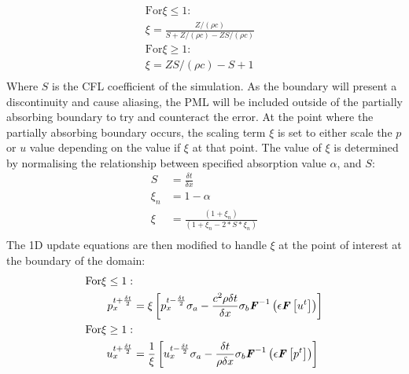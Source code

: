 \begin{equation}
\begin{aligned}
\textrm{For} \xi \leq 1: & \\
\xi = \frac{Z / (\rho c)}{S + Z / (\rho c) - Z S / (\rho c)}\\
\textrm{For} \xi \geq 1: & \\
\xi = Z S / (\rho c) - S + 1\\
\end{aligned}
\end{equation}
Where $S$ is the CFL coefficient of the simulation. As the boundary will present a discontinuity and cause aliasing, the PML will be included outside of the partially absorbing boundary to try and counteract the error. At the point where the partially absorbing boundary occurs, the scaling term $\xi$ is set to either scale the $p$ or $u$ value depending on the value if $\xi$ at that point. The value of $\xi$ is determined by normalising the relationship between specified absorption value $\alpha$, and $S$:\\
\begin{equation}
\begin{aligned}
S & = \frac{\delta t}{\delta x} \\
\xi_n & = 1 - \alpha \\
\xi & = \frac{(1 + \xi_n)}{(1 + \xi_n - 2 * S * \xi_n)}\\
\end{aligned}
\end{equation}
The 1D update equations are then modified to handle $\xi$ at the point of interest at the boundary of the domain:\\
\begin{equation}
\begin{aligned}
\textrm{For} \xi \leq 1: & \\
p^{t + \frac{\delta t}{2}}_{x} &= \xi \left[ p^{t - \frac{\delta t}{2}}_{x} \sigma_a - \frac{c^2 \rho \delta t}{\delta x} \sigma_b \textbf{\textit{F}}^{-1}\left( \epsilon \textbf{\textit{F}} \left[ u^{t} \right] \right) \right] \\
\textrm{For} \xi \geq 1: & \\
u^{t + \frac{\delta t}{2}}_{x} &= \frac{1}{\xi} \left[ u^{t - \frac{\delta t}{2}}_{x} \sigma_a - \frac{\delta t}{\rho \delta x} \sigma_b \textbf{\textit{F}}^{-1}\left(\epsilon \textbf{\textit{F}}\left[p^{t}\right] \right) \right] \\
\end{aligned}
\end{equation}
